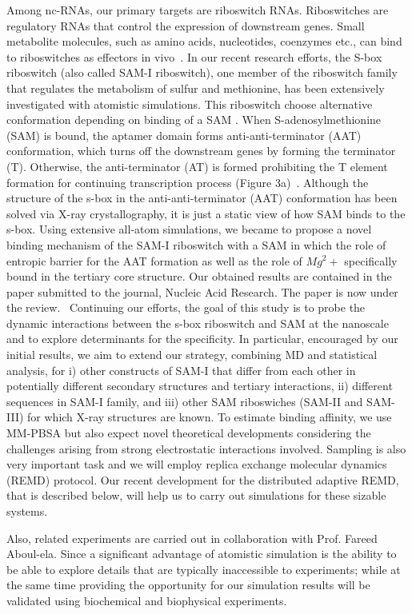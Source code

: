 \documentclass[a4paper,10pt]{article}
\begin{document}
Among nc-RNAs, our primary targets are riboswitch RNAs. Riboswitches are regulatory RNAs that control the expression of downstream genes. Small metabolite 
molecules, such as amino acids, nucleotides, coenzymes etc., can bind to riboswitches as effectors in  vivo~\cite{mandal}. 
In our recent research efforts, the S-box riboswitch (also called SAM-I riboswitch), one member of the riboswitch family that
regulates the metabolism of sulfur and methionine, has been extensively investigated with atomistic simulations.  This riboswitch choose alternative conformation depending on binding of a SAM .  When S-adenosylmethionine (SAM) is bound, the
aptamer domain forms anti-anti-terminator (AAT) conformation,
which turns off the downstream genes by forming the terminator (T). Otherwise, the anti-terminator (AT) is formed prohibiting the T element formation for continuing transcription process (Figure 3a)~\cite{brooke}. Although the 
structure of the s-box in the anti-anti-terminator (AAT) conformation has been solved via X-ray 
crystallography, it is just a static view of how SAM binds to the s-box.  Using extensive all-atom simulations, we became to propose a novel binding mechanism of the SAM-I riboswitch with a SAM in which the role of entropic barrier for the AAT formation as well as the role of $Mg^2+$ specifically bound in the tertiary core structure.  Our obtained results are contained in the paper submitted to the journal, Nucleic Acid Research.  The paper is now under the review.~\cite{SAM-I-NAR2009}  Continuing our efforts, the goal of this study is to probe 
the dynamic interactions between the s-box riboswitch and SAM at the nanoscale and to explore 
determinants for the specificity. In particular, encouraged by our initial results, we aim to extend our strategy, combining MD and statistical analysis, for i) other constructs of SAM-I that differ from each other in potentially different secondary structures and tertiary interactions, ii) different sequences in SAM-I family, and iii) other SAM riboswiches (SAM-II and SAM-III) for which X-ray structures are known.  To estimate binding affinity, we use MM-PBSA but also expect novel theoretical developments considering the challenges arising from strong electrostatic interactions involved.  Sampling is also very important task and we will employ replica exchange molecular dynamics (REMD) protocol.  Our recent development for the distributed adaptive REMD, that is described below, will help us to carry out simulations for these sizable systems.    

Also, related experiments are carried out in collaboration with Prof. Fareed Aboul-ela.   Since a significant advantage of atomistic simulation is the ability to be able to explore details that are typically inaccessible to experiments; while at the same time providing the opportunity for our simulation results will be validated using biochemical and biophysical experiments. 
\end{document}
